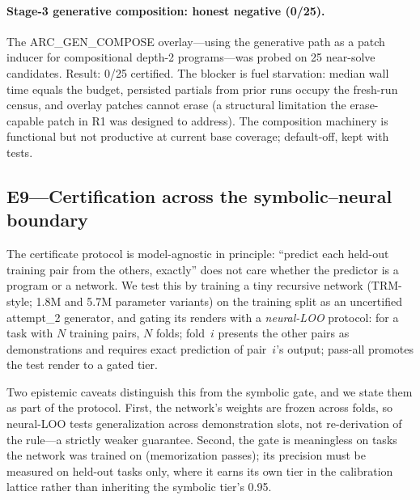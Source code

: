 \documentclass[11pt]{article}
\begin{document}
\paragraph{Stage-3 generative composition: honest negative (0/25).}
The ARC\_GEN\_COMPOSE overlay---using the generative path as a patch
inducer for compositional depth-2 programs---was probed on 25 near-solve
candidates.  Result: 0/25 certified.  The blocker is fuel starvation:
median wall time equals the budget, persisted partials from prior runs
occupy the fresh-run census, and overlay patches cannot erase (a structural
limitation the erase-capable patch in R1 was designed to address).  The
composition machinery is functional but not productive at current base
coverage; default-off, kept with tests.

\subsection{E9---Certification across the symbolic--neural boundary}

The certificate protocol is model-agnostic in principle: ``predict each
held-out training pair from the others, exactly'' does not care whether the
predictor is a program or a network.  We test this by training a tiny
recursive network (TRM-style; 1.8M and 5.7M parameter variants) on the
training split as an uncertified attempt\_2 generator, and gating its
renders with a \emph{neural-LOO} protocol: for a task with $N$ training
pairs, $N$ folds; fold~$i$ presents the other pairs as demonstrations and
requires exact prediction of pair~$i$'s output; pass-all promotes the test
render to a gated tier.

Two epistemic caveats distinguish this from the symbolic gate, and we state
them as part of the protocol.  First, the network's weights are frozen
across folds, so neural-LOO tests generalization across demonstration
slots, not re-derivation of the rule---a strictly weaker guarantee.
Second, the gate is meaningless on tasks the network was trained on
(memorization passes); its precision must be measured on held-out tasks
only, where it earns its own tier in the calibration lattice rather than
inheriting the symbolic tier's 0.95.
\end{document}
